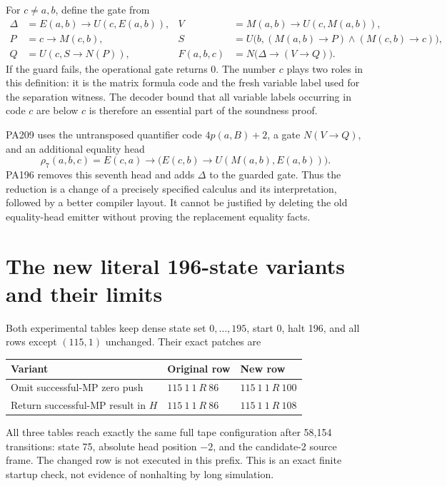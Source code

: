 \documentclass[11pt,a4paper]{article}
\begin{document}
For $c\ne a,b$, define the gate from
\begin{align*}
 \Delta&=E(a,b)\to U(c,E(a,b)), & V&=M(a,b)\to U(c,M(a,b)),\\
 P&=c\to M(c,b), &
 S&=U\bigl(b,(M(a,b)\to P)\wedge(M(c,b)\to c)\bigr),\\
 Q&=U(c,S\to N(P)), & F(a,b,c)&=N\bigl(\Delta\to(V\to Q)\bigr).
\end{align*}
If the guard fails, the operational gate returns 0. The number $c$
plays two roles in this definition: it is the matrix formula code and
the fresh variable label used for the separation witness. The decoder
bound that all variable labels occurring in code $c$ are below $c$
is therefore an essential part of the soundness proof.

PA209 uses the untransposed quantifier code $4p(a,B)+2$, a gate
$N(V\to Q)$, and an additional equality head
\[
 \rho_7(a,b,c)=E(c,a)\to
       \bigl(E(c,b)\to U(M(a,b),E(a,b))\bigr).
\]
PA196 removes this seventh head and adds $\Delta$ to the guarded gate.
Thus the reduction is a change of a precisely specified calculus and
its interpretation, followed by a better compiler layout. It cannot be
justified by deleting the old equality-head emitter without proving the
replacement equality facts.

\section{The new literal 196-state variants and their limits}

Both experimental tables keep dense state set $0,\ldots,195$, start 0,
halt 196, and all rows except $(115,1)$ unchanged. Their exact patches are
\begin{center}
\begin{tabular}{@{}lll@{}}
\toprule
Variant & Original row & New row\\\midrule
Omit successful-MP zero push & $115\ 1\ 1\ R\ 86$ & $115\ 1\ 1\ R\ 100$\\
Return successful-MP result in $H$ & $115\ 1\ 1\ R\ 86$ & $115\ 1\ 1\ R\ 108$\\
\bottomrule
\end{tabular}
\end{center}
All three tables reach exactly the same full tape configuration after
58,154 transitions: state 75, absolute head position $-2$, and the
candidate-2 source frame. The changed row is not executed in this prefix.
This is an exact finite startup check, not evidence of nonhalting by
long simulation.
\end{document}
